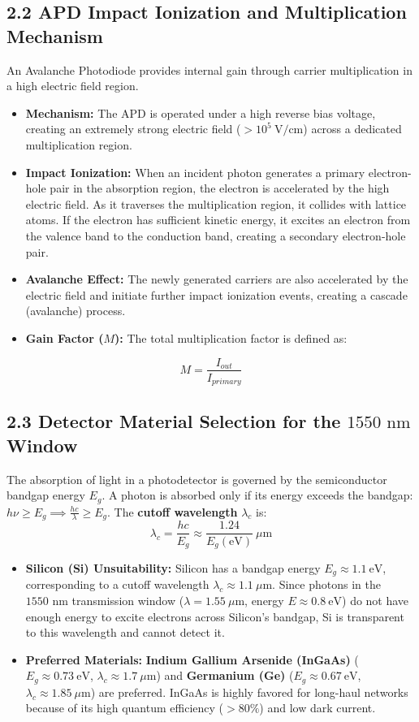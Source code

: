 \subsection{2.2 APD Impact Ionization and Multiplication Mechanism}
An Avalanche Photodiode provides internal gain through carrier multiplication in a high electric field region.
\begin{itemize}
  \item   \textbf{Mechanism:} The APD is operated under a high reverse bias voltage, creating an extremely strong electric field ($> 10^5\ \text{V/cm}$) across a dedicated multiplication region.
  \item   \textbf{Impact Ionization:} When an incident photon generates a primary electron-hole pair in the absorption region, the electron is accelerated by the high electric field. As it traverses the multiplication region, it collides with lattice atoms. If the electron has sufficient kinetic energy, it excites an electron from the valence band to the conduction band, creating a secondary electron-hole pair.
  \item   \textbf{Avalanche Effect:} The newly generated carriers are also accelerated by the electric field and initiate further impact ionization events, creating a cascade (avalanche) process.
  \item   \textbf{Gain Factor ($M$):} The total multiplication factor is defined as:
\end{itemize}
    \[ M = \frac{I_{out}}{I_{primary}} \]


\subsection{2.3 Detector Material Selection for the $1550\text{ nm}$ Window}
The absorption of light in a photodetector is governed by the semiconductor bandgap energy $E_g$. A photon is absorbed only if its energy exceeds the bandgap: $h\nu \ge E_g \implies \frac{hc}{\lambda} \ge E_g$.
The \textbf{cutoff wavelength} $\lambda_c$ is:
\[ \lambda_c = \frac{hc}{E_g} \approx \frac{1.24}{E_g(\text{eV})}\ \mu\text{m} \]

\begin{itemize}
  \item   \textbf{Silicon (Si) Unsuitability:} Silicon has a bandgap energy $E_g \approx 1.1\ \text{eV}$, corresponding to a cutoff wavelength $\lambda_c \approx 1.1\ \mu\text{m}$. Since photons in the $1550\text{ nm}$ transmission window ($\lambda = 1.55\ \mu\text{m}$, energy $E \approx 0.8\ \text{eV}$) do not have enough energy to excite electrons across Silicon's bandgap, Si is transparent to this wavelength and cannot detect it.
  \item   \textbf{Preferred Materials:} \textbf{Indium Gallium Arsenide (InGaAs)} ($E_g \approx 0.73\ \text{eV}$, $\lambda_c \approx 1.7\ \mu\text{m}$) and \textbf{Germanium (Ge)} ($E_g \approx 0.67\ \text{eV}$, $\lambda_c \approx 1.85\ \mu\text{m}$) are preferred. InGaAs is highly favored for long-haul networks because of its high quantum efficiency ($> 80\%$) and low dark current.
\end{itemize}


